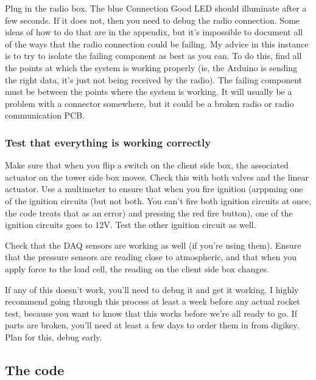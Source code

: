 \documentclass[11pt]{article}
\begin{document}
Plug in the radio box. The blue Connection Good LED should illuminate after a
few seconds. If it does not, then you need to debug the radio connection. Some
ideas of how to do that are in the appendix, but it's impossible to document all
of the ways that the radio connection could be failing. My advice in this
instance is to try to isolate the failing component as best as you can. To do
this, find all the points at which the system is working properly (ie, the
Arduino is sending the right data, it's just not being received by the
radio). The failing component must be between the points where the system is
working. It will usually be a problem with a connector somewhere, but it could
be a broken radio or radio communication PCB.

\subsubsection{Test that everything is working correctly}
\label{sec:org509e3fc}
Make sure that when you flip a switch on the client side box, the associated
actuator on the tower side box moves. Check this with both valves and the linear
actuator. Use a multimeter to ensure that when you fire ignition (arppming one of
the ignition circuits (but not both. You can't fire both ignition circuits at
once, the code treats that as an error) and pressing the red fire button), one
of the ignition circuits goes to 12V. Test the other ignition circuit as well.

Check that the DAQ sensors are working as well (if you're using them). Ensure
that the pressure sensors are reading close to atmospheric, and that when you
apply force to the load cell, the reading on the client side box changes.

If any of this doesn't work, you'll need to debug it and get it working. I
highly recommend going through this process at least a week before any actual
rocket test, because you want to know that this works before we're all ready to
go. If parts are broken, you'll need at least a few days to order them in from
digikey. Plan for this, debug early.

\subsection{The code}
\label{sec:org71acea6}
\end{document}
